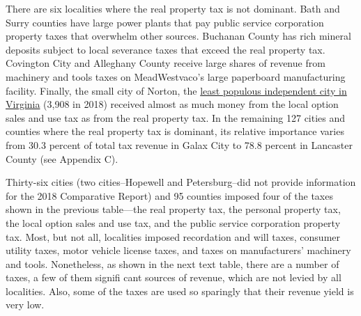 \documentclass[
]{book}
\begin{document}
There are six localities where the real property tax is not dominant. Bath and Surry counties have large power plants that pay public service corporation property taxes that overwhelm other sources. Buchanan County has rich mineral deposits subject to local severance taxes that exceed the real property tax. Covington City and Alleghany County receive large shares of revenue from machinery and tools taxes on MeadWestvaco's large paperboard manufacturing facility. Finally, the small city of Norton, the \href{https://demographics.coopercenter.org/population-estimates-age-sex-race-hispanic-towns/}{least populous independent city in Virginia} (3,908 in 2018) received almost as much money from the local option sales and use tax as from the real property tax. In the remaining 127 cities and counties where the real property tax is dominant, its relative importance varies from 30.3 percent of total tax revenue in Galax City to 78.8 percent in Lancaster County (see Appendix C).

Thirty-six cities (two cities--Hopewell and Petersburg--did not provide information for the 2018 Comparative Report) and 95 counties imposed four of the taxes shown in the previous table---the real property tax, the personal property tax, the local option sales and use tax, and the public service corporation property tax. Most, but not all, localities imposed recordation and will taxes, consumer utility taxes, motor vehicle license taxes, and taxes on manufacturers' machinery and tools. Nonetheless, as shown in the next text table, there are a number of taxes, a few of them signifi cant sources of revenue, which are not levied by all localities. Also, some of the taxes are used so sparingly that their revenue yield is very low.
\end{document}

